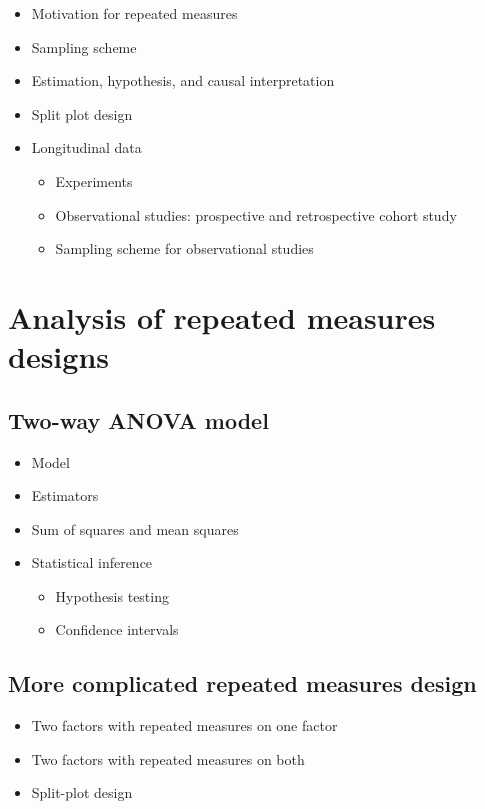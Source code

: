 \documentclass[12pt,]{book}
\providecommand{\tightlist}{%
  \setlength{\itemsep}{0pt}\setlength{\parskip}{0pt}}
\begin{document}
\begin{itemize}
\tightlist
\item
  Motivation for repeated measures
\item
  Sampling scheme
\item
  Estimation, hypothesis, and causal interpretation
\item
  Split plot design
\item
  Longitudinal data

  \begin{itemize}
  \tightlist
  \item
    Experiments
  \item
    Observational studies: prospective and retrospective cohort study
  \item
    Sampling scheme for observational studies
  \end{itemize}
\end{itemize}

\section{Analysis of repeated measures
designs}\label{analysis-of-repeated-measures-designs}

\subsection{Two-way ANOVA model}\label{two-way-anova-model}

\begin{itemize}
\tightlist
\item
  Model
\item
  Estimators
\item
  Sum of squares and mean squares
\item
  Statistical inference

  \begin{itemize}
  \tightlist
  \item
    Hypothesis testing
  \item
    Confidence intervals
  \end{itemize}
\end{itemize}

\subsection{More complicated repeated measures
design}\label{more-complicated-repeated-measures-design}

\begin{itemize}
\tightlist
\item
  Two factors with repeated measures on one factor
\item
  Two factors with repeated measures on both
\item
  Split-plot design
\end{itemize}
\end{document}
